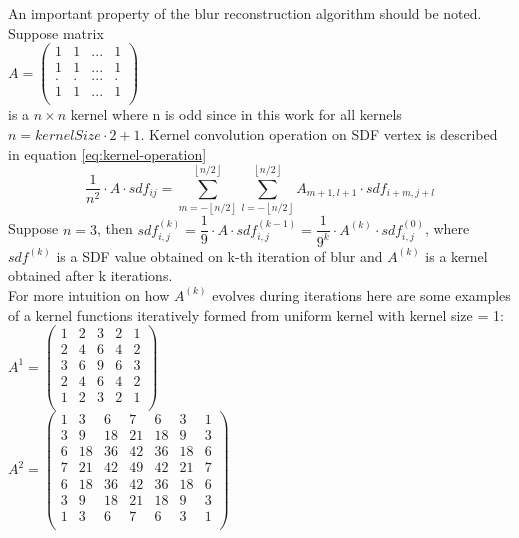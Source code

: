 An important property of the blur reconstruction algorithm should be noted.\\
Suppose matrix \\
$A = 
\begin{pmatrix}
	1 & 1 & ... & 1\\
	1 & 1 & ... & 1\\
	. & . & ... & .\\
	1 & 1 & ... & 1\\
\end{pmatrix}$\\
is a $n \times n$ kernel where n is odd since in this work for all kernels $n = kernelSize \cdot 2 + 1$.
Kernel convolution operation on SDF vertex is described in equation \ref{eq:kernel-operation}
\begin{equation}
	\dfrac{1}{n^2}\cdot A\cdot sdf_{ij} = \sum_{m=- \left \lfloor{n/2}\right \rfloor}^{\left \lfloor{n/2}\right \rfloor}
		{\sum_{l=- \left \lfloor{n/2}\right \rfloor}^{\left \lfloor{n/2}\right \rfloor}{ A_{m+1, l+1} \cdot sdf_{i+m, j+l}}}
	\label{eq:kernel-operation}
\end{equation}
Suppose $n=3$, then $ sdf^{(k)}_{i,j} = \dfrac{1}{9} \cdot A \cdot sdf^{(k-1)}_{i,j} = \dfrac{1}{9^k} \cdot A^{(k)} \cdot sdf^{(0)}_{i,j}$, where $sdf^{(k)}$ is a SDF value obtained on k-th iteration of blur and $A^{(k)}$ is a kernel obtained after k iterations.\\
For more intuition on how $A^{(k)}$ evolves during iterations here are some examples of a kernel functions iteratively formed from uniform kernel with kernel size = 1:\\
$A^1 = 
\begin{pmatrix}
1 & 2 & 3 & 2 & 1\\
2 & 4 & 6 & 4 & 2\\
3 & 6 & 9 & 6 & 3\\
2 & 4 & 6 & 4 & 2\\
1 & 2 & 3 & 2 & 1\\
\end{pmatrix}$\\
$A^2 = 
\begin{pmatrix}
 1 & 3 & 6 & 7 & 6 & 3 & 1\\
 3 & 9 & 18 & 21 & 18 & 9 & 3\\
 6 & 18 & 36 & 42 & 36 & 18 & 6\\
 7 & 21 & 42 & 49 & 42 & 21 & 7\\
 6 & 18 & 36 & 42 & 36 & 18 & 6\\
 3 & 9 & 18 & 21 & 18 & 9 & 3\\
 1 & 3 & 6 & 7 & 6 & 3 & 1\\
\end{pmatrix}$\\
